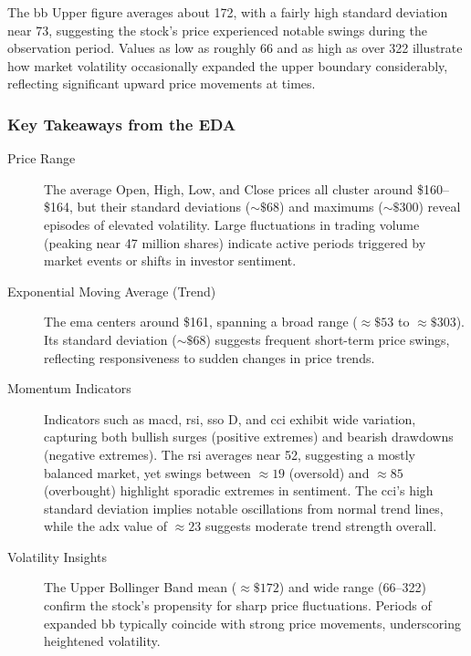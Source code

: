 The \acrshort{bb} Upper figure averages about 172, with a fairly high standard deviation 
near 73, suggesting the stock’s price experienced notable swings during the observation 
period. Values as low as roughly 66 and as high as over 322 illustrate how market 
volatility occasionally expanded the upper boundary considerably, reflecting significant 
upward price movements at times.

\subsubsection*{Key Takeaways from the EDA}

\begin{description}
    \item[Price Range]
    The average Open, High, Low, and Close prices all cluster around \$160--\$164, but their
    standard deviations (\(\sim\$68\)) and maximums (\(\sim\$300\)) reveal episodes of elevated
    volatility.
    Large fluctuations in trading volume (peaking near 47 million shares) indicate active 
    periods triggered by market events or shifts in investor sentiment.

    \item[Exponential Moving Average (Trend)] 
    The \acrshort{ema} centers around \$161, spanning a broad range (\(\approx\$53\) to
    \(\approx\$303\)).
    Its standard deviation (\(\sim\$68\)) suggests frequent short-term price 
    swings, reflecting responsiveness to sudden changes in price trends.

    \item[Momentum Indicators]
    Indicators such as \acrshort{macd}, \acrshort{rsi}, \acrshort{sso} D, and 
    \acrshort{cci} exhibit wide variation, capturing both bullish surges (positive extremes)
    and bearish drawdowns (negative extremes).
    The \acrshort{rsi} averages near 52, suggesting a mostly balanced market, yet swings
    between \(\approx19\) (oversold) and \(\approx85\) (overbought) highlight sporadic
    extremes in sentiment.
    The \acrshort{cci}’s high standard deviation implies notable oscillations from normal
    trend lines, while the \acrshort{adx} value of \(\approx23\) suggests moderate
    trend strength overall.

    \item[Volatility Insights]
    The Upper Bollinger Band mean (\(\approx\$172\)) and wide range (66--322) confirm
    the stock’s propensity for sharp price fluctuations.
    Periods of expanded \acrshort{bb} typically coincide with strong price 
    movements, underscoring heightened volatility.
\end{description}
